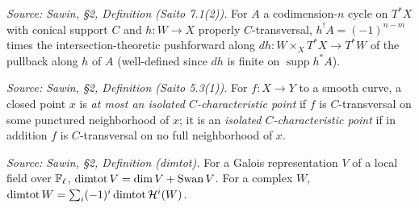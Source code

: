 \begin{definition}
  \label{def:sawin_shriek_pullback}
  \textit{Source: Sawin, §2, Definition (Saito 7.1(2)).}
  For $A$ a codimension-$n$ cycle on $T^*X$ with conical support $C$ and $h:W\to
  X$ properly $C$-transversal, $h^!A = (-1)^{n-m}$ times the
  intersection-theoretic pushforward along $dh:W\times_X T^*X\to T^*W$ of the
  pullback along $h$ of $A$ (well-defined since $dh$ is finite on $\operatorname{supp} h^*A$).
\end{definition}

\begin{definition}
  \label{def:sawin_isolated_char_point}
  \textit{Source: Sawin, §2, Definition (Saito 5.3(1)).}
  For $f:X\to Y$ to a smooth curve, a closed point $x$ is \emph{at most an
  isolated $C$-characteristic point} if $f$ is $C$-transversal on some punctured
  neighborhood of $x$; it is an \emph{isolated $C$-characteristic point} if in
  addition $f$ is $C$-transversal on no full neighborhood of $x$.
\end{definition}

\begin{definition}
  \label{def:sawin_dimtot}
  \textit{Source: Sawin, §2, Definition (dimtot).}
  For a Galois representation $V$ of a local field over $\mathbb{F}_\ell$,
  $\operatorname{dimtot} V = \dim V + \operatorname{Swan} V$.  For a complex $W$,
  $\operatorname{dimtot} W = \sum_i (-1)^i \operatorname{dimtot} \mathcal{H}^i(W)$.
\end{definition}


